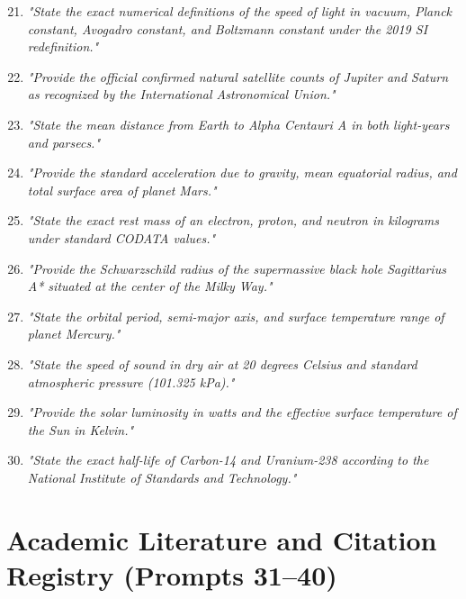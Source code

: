 \begin{enumerate}
    \setcounter{enumi}{20}
    \item \textit{"State the exact numerical definitions of the speed of light in vacuum, Planck constant, Avogadro constant, and Boltzmann constant under the 2019 SI redefinition."}
    \item \textit{"Provide the official confirmed natural satellite counts of Jupiter and Saturn as recognized by the International Astronomical Union."}
    \item \textit{"State the mean distance from Earth to Alpha Centauri A in both light-years and parsecs."}
    \item \textit{"Provide the standard acceleration due to gravity, mean equatorial radius, and total surface area of planet Mars."}
    \item \textit{"State the exact rest mass of an electron, proton, and neutron in kilograms under standard CODATA values."}
    \item \textit{"Provide the Schwarzschild radius of the supermassive black hole Sagittarius A* situated at the center of the Milky Way."}
    \item \textit{"State the orbital period, semi-major axis, and surface temperature range of planet Mercury."}
    \item \textit{"State the speed of sound in dry air at 20 degrees Celsius and standard atmospheric pressure (101.325 kPa)."}
    \item \textit{"Provide the solar luminosity in watts and the effective surface temperature of the Sun in Kelvin."}
    \item \textit{"State the exact half-life of Carbon-14 and Uranium-238 according to the National Institute of Standards and Technology."}
\end{enumerate}

\section{Academic Literature and Citation Registry (Prompts 31--40)}
\label{sec:app_citation_prompts}

